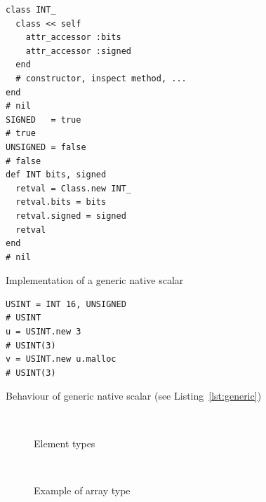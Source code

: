 \documentclass[10pt,journal,compsoc]{joser1}
\newcommand{\lst}[1]{Listing~\ref{lst:#1}}
\begin{document}
\begin{listing}[htbp]
  \begin{verbatim}
class INT_
  class << self
    attr_accessor :bits
    attr_accessor :signed
  end
  # constructor, inspect method, ...
end
# nil
SIGNED   = true
# true
UNSIGNED = false
# false
def INT bits, signed
  retval = Class.new INT_
  retval.bits = bits
  retval.signed = signed
  retval
end
# nil
  \end{verbatim}
  \caption{Implementation of a generic native scalar\label{lst:generic}}
\end{listing}

\begin{listing}[htbp]
  \begin{verbatim}
USINT = INT 16, UNSIGNED
# USINT
u = USINT.new 3
# USINT(3)
v = USINT.new u.malloc
# USINT(3)
  \end{verbatim}
  \caption{Behaviour of generic native scalar (see
  \lst{generic})\label{lst:gentest}}
\end{listing}


\begin{figure}[htbp]
  \begin{center}
    \\
    \caption{Element types\label{fig:types}}
  \end{center}
\end{figure}


\begin{figure}[htbp]
   \begin{center}
     \\
     \caption{Example of array type\label{fig:image}}
   \end{center}
\end{figure}
\end{document}

